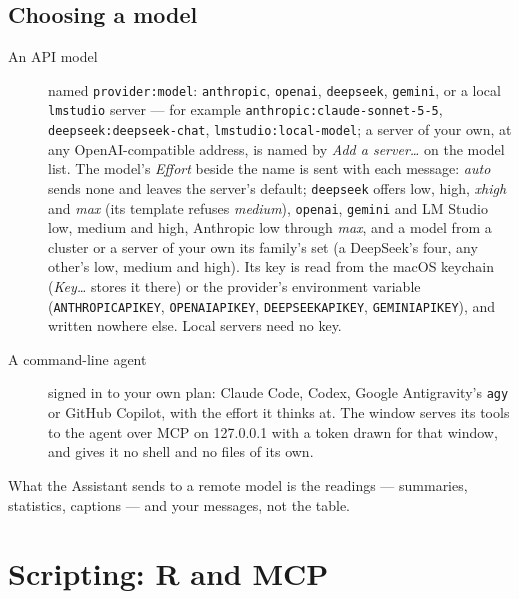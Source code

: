 \documentclass[11pt]{report}
\newcommand{\codeunderscore}{\textunderscore\allowbreak}
\newcommand{\code}[1]{\texttt{\let\_\codeunderscore #1}}
\begin{document}
\section{Choosing a model}
\begin{description}
  \item[An API model] named \code{provider:model}: \code{anthropic}, \code{openai},
        \code{deepseek}, \code{gemini}, or a local \code{lmstudio} server --- for
        example \code{anthropic:claude-sonnet-5-5}, \code{deepseek:deepseek-chat},
        \code{lmstudio:local-model}; a server of your own, at any OpenAI-compatible
        address, is named by \emph{Add a server\ldots} on the model list. The model's
        \emph{Effort} beside the name is sent with each message: \emph{auto} sends none
        and leaves the server's default; \code{deepseek} offers low, high, \emph{xhigh}
        and \emph{max} (its template refuses \emph{medium}), \code{openai}, \code{gemini}
        and LM Studio low, medium and high, Anthropic low through \emph{max}, and a model
        from a cluster or a server of your own its family's set (a DeepSeek's four, any
        other's low, medium and high). Its key is
        read from the
        macOS keychain (\emph{Key\ldots} stores it there) or the provider's environment
        variable (\code{ANTHROPIC\_API\_KEY}, \code{OPENAI\_API\_KEY},
        \code{DEEPSEEK\_API\_KEY}, \code{GEMINI\_API\_KEY}), and written nowhere else.
        Local servers need no key.
  \item[A command-line agent] signed in to your own plan: Claude Code, Codex, Google
        Antigravity's \code{agy} or GitHub Copilot, with the effort it thinks at. The
        window serves its tools to the agent over MCP on 127.0.0.1 with a token drawn for
        that window, and gives it no shell and no files of its own.
\end{description}
What the Assistant sends to a remote model is the readings --- summaries, statistics,
captions --- and your messages, not the table.

\chapter{Scripting: R and MCP}\label{ch:script}
\end{document}
